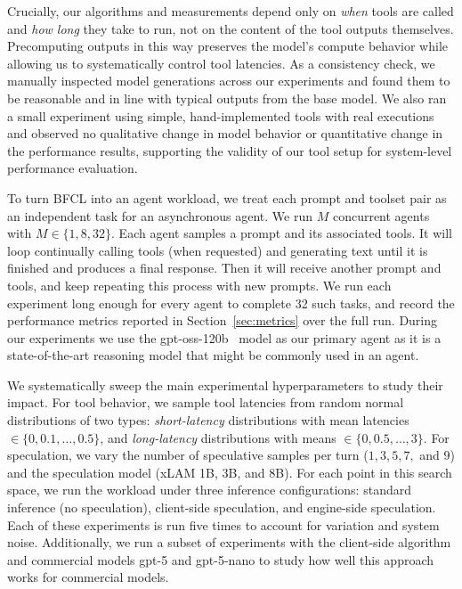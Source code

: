 Crucially, our algorithms and measurements depend only on \emph{when} tools are called and \emph{how long} they take to run, not on the content of the tool outputs themselves. Precomputing outputs in this way preserves the model’s compute behavior while allowing us to systematically control tool latencies. As a consistency check, we manually inspected model generations across our experiments and found them to be reasonable and in line with typical outputs from the base model. We also ran a small experiment using simple, hand-implemented tools with real executions and observed no qualitative change in model behavior or quantitative change in the performance results, supporting the validity of our tool setup for system-level performance evaluation.


To turn BFCL into an agent workload, we treat each prompt and toolset pair as an independent task for an asynchronous agent. We run $M$ concurrent agents with $M \in \{1, 8, 32\}$. 
Each agent samples a prompt and its associated tools. It will loop continually calling tools (when requested) and generating text until it is finished and produces a final response. Then it will receive another prompt and tools, and keep repeating this process with new prompts.
We run each experiment long enough for every agent to complete 32 such tasks, and record the performance metrics reported in Section~\ref{sec:metrics} over the full run.
During our experiments we use the gpt-oss-120b~\cite{openai_gpt-oss-120b_2025} model as our primary agent as it is a state-of-the-art reasoning model that might be commonly used in an agent.

We systematically sweep the main experimental hyperparameters to study their impact.
For tool behavior, we sample tool latencies from random normal distributions of two types:
\emph{short-latency} distributions with mean latencies $\in 
\{0, 0.1,\ldots,0.5\}$,  and \emph{long-latency} distributions with means $\in \{0,0.5,\ldots,3\}$.
For speculation, we vary the number of speculative samples per turn ($1, 3, 5, 7,$ and $9$) and the speculation model (xLAM 1B, 3B, and 8B).
For each point in this search space, we run the workload under three inference configurations: standard inference (no speculation), client-side speculation, and engine-side speculation.
Each of these experiments is run five times to account for variation and system noise.
Additionally, we run a subset of experiments with the client-side algorithm and commercial models gpt-5 and gpt-5-nano to study how well this approach works for commercial models.

